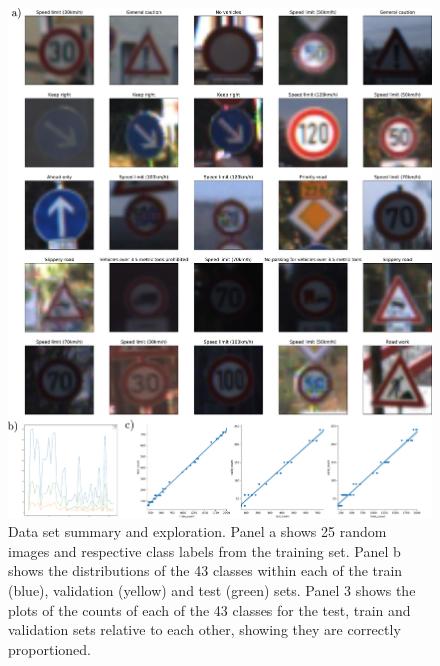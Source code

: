 \documentclass[letterpaper,12pt]{article}
\begin{document}
\begin{figure}
\centering
\includegraphics[scale=0.4]{../results/fig1.pdf}
\caption{Data set summary and exploration. Panel a shows 25 random images and respective class labels from the training set. Panel b shows the distributions of the 43 classes within each of the train (blue), validation (yellow) and test (green) sets. Panel 3 shows the plots of the counts of each of the 43 classes for the test, train and validation sets relative to each other, showing they are correctly proportioned.}
\end{figure}
\newpage
\end{document}
